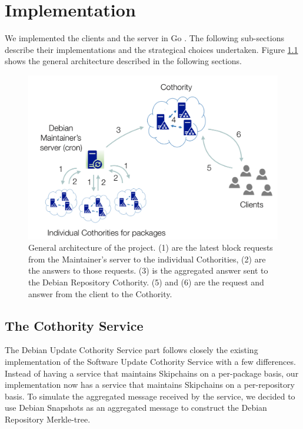 \documentclass[11pt, upma4paper, twoside, openany, parskip=half]{book}
\begin{document}
\chapter{Implementation}
We implemented the clients and the server in Go \cite{_go_????}. The following sub-sections describe their implementations and the strategical choices undertaken. Figure \ref{architecture} shows the general architecture described in the following sections.

\begin{figure}[H]
	\centering
	\includegraphics[width=330pt]{architecture.png}
	\caption{General architecture of the project. (1) are the latest block requests from the Maintainer's server to the individual Cothorities, (2) are the answers to those requests. (3) is the aggregated answer sent to the Debian Repository Cothority. (5) and (6) are the request and answer from the client to the Cothority.}
	\label{architecture}
\end{figure}

\section{The Cothority Service}
The Debian Update Cothority Service part follows closely the existing implementation of the Software Update Cothority Service with a few differences. Instead of having a service that maintains Skipchains on a per-package basis, our implementation now has a service that maintains Skipchains on a per-repository basis. To simulate the aggregated message received by the service, we decided to use Debian Snapshots \cite{_snapshot.debian.org_????} as an aggregated message to construct the Debian Repository Merkle-tree.
\end{document}

